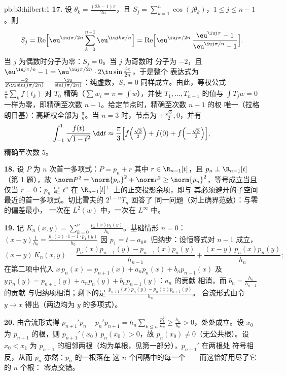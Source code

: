 \begin{solution}{pb:b3:hilbert:1}
\textbf{17.} 设 $\theta_k = \frac{(2k-1)\pi}{2n}$，且 $S_j
= \sum_{k=1}^n\cos(j\theta_k)$，$1 \leq j \leq n-1$。则
\[
S_j = \operatorname{Re}\Bigl[\eu^{\iu j\pi/2n}
\sum_{k=0}^{n-1}\eu^{\iu jk\pi/n}\Bigr]
= \operatorname{Re}\Bigl[\eu^{\iu j\pi/2n}\,
\frac{\eu^{\iu j\pi} - 1}{\eu^{\iu j\pi/n} - 1}\Bigr] .
\]
当 $j$ 为偶数时分子为零：$S_j = 0$。当 $j$ 为奇数时
分子为 $-2$，且 $\eu^{\iu j\pi/n} - 1 =
\eu^{\iu j\pi/2n}\cdot2\iu\sin\frac{j\pi}{2n}$，于是整个
表达式为 $\frac{-2}{2\iu\sin(j\pi/2n)} =
\frac{\iu}{\sin(j\pi/2n)}$：纯虚数，$S_j = 0$
同样成立。由此，等权公式 $\frac\pi n\sum_kf(t_k)$
对 $T_0$ 精确（$\sum w_i = \pi = \int w$），并使 $T_1,
\dots, T_{n-1}$ 的值与 $\int T_jw = 0$ 一样为零，即精确至次数
$n - 1$。给定节点时，精确至次数 $n-1$ 的权
唯一（拉格朗日基）：高斯权全部为
$\frac\pi n$。当 $n = 3$ 时，节点为 $\pm\frac{\sqrt3}2, 0$，并有
\[
\int_{-1}^1\frac{f(t)}{\sqrt{1 - t^2}}\,\dd t \approx
\frac\pi3\Bigl[f\Bigl(\tfrac{\sqrt3}2\Bigr) + f(0) +
f\Bigl(-\tfrac{\sqrt3}2\Bigr)\Bigr],
\]
精确至次数 $5$。

\textbf{18.} 设 $P$ 为 $n$ 次首一多项式：$P = p_n + r$
其中 $r \in \R_{n-1}[t]$，且 $p_n \perp \R_{n-1}[t]$
（第 1 题），故 $\norm P^2 = \norm{p_n}^2 + \norm r^2 \geq
\norm{p_n}^2$，等号成立当且仅当 $r = 0$：$p_n$ 是
$t^n$ 在
$\R_{n-1}[t]^\perp$ 上的正交投影余项，即与
其必须避开的子空间最近的首一多项式。切比雪夫的 $2^{1-n}T_n$ 回答了
同一问题（对上确界范数）：与零的偏差最小，
一次在 $L^2(w)$ 中，一次在 $L^\infty$ 中。

\textbf{19.} 记 $K_n(x, y) =
\sum_{k=0}^n\frac{p_k(x)p_k(y)}{h_k}$。基础情形 $n = 0$：$(x -
y)\frac1{h_0} = \frac{p_1(x)\cdot1 - 1\cdot p_1(y)}{h_0}$
因 $p_1 = t - a_0$。归纳步：设恒等式对 $n -
1$ 成立，
\[
(x - y)\,K_n(x,y) = \frac{p_n(x)p_{n-1}(y) -
p_{n-1}(x)p_n(y)}{h_{n-1}} +
\frac{(x - y)\,p_n(x)p_n(y)}{h_n} ;
\]
在第二项中代入 $x\,p_n(x) = p_{n+1}(x) + a_np_n(x) +
b_np_{n-1}(x)$ 及 $y\,p_n(y) = p_{n+1}(y) + a_np_n(y) +
b_np_{n-1}(y)$：$a_n$ 的贡献
相消，而 $b_n = \frac{h_n}{h_{n-1}}$ 的贡献
与归纳项相消；剩下的是
$\frac{p_{n+1}(x)p_n(y) - p_n(x)p_{n+1}(y)}{h_n}$。
合流形式由令 $y \to x$ 得出（两边均为
$y$ 的多项式）。

\textbf{20.} 由合流形式得 $p_{n+1}'p_n -
p_n'p_{n+1} = h_n\sum_{k\leq n}\frac{p_k^2}{h_k} \geq
\frac{h_n}{h_0} > 0$，处处成立。设 $x_0$ 为
$p_{n+1}$ 的根，则 $p_{n+1}'(x_0)\,p_n(x_0) > 0$，故 $p_n(x_0) \neq
0$（无公共根）。设 $x_0 < x_1$ 为
$p_{n+1}$ 的相邻两根（均为单根，见第一部分），$p_{n+1}'$ 在两根处
符号相反，从而 $p_n$ 亦然：$p_n$ 的一根落在
这 $n$ 个间隔中的每一个——而这恰好用尽了它的 $n$ 个根：
零点交错。


\end{solution}
